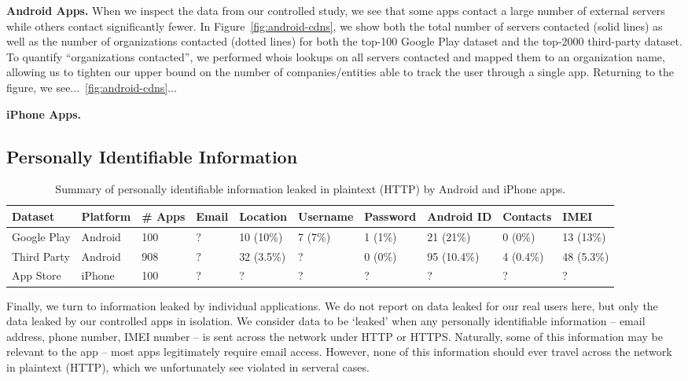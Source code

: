   {\bf Android Apps.}
  When we inspect the data from our controlled study, we see that some apps contact a large number of external servers while others contact significantly fewer.
  In Figure~\ref{fig:android-cdns}, we show both the total number of servers contacted (solid lines) as well as the number of organizations contacted (dotted lines) for both the top-100 Google Play dataset and the top-2000 third-party dataset.
  To quantify ``organizations contacted'', we performed whois lookups on all servers contacted and mapped them to an organization name, allowing us to tighten our upper bound on the number of companies/entities able to track the user through a single app.
  Returning to the figure, we see...~\ref{fig:android-cdns}...


  {\bf iPhone Apps.}

\subsection{Personally Identifiable Information}
  \begin{table}
    \begin{tabular}{l|l|l|l|l|l|l|l|l|l}
       Dataset&Platform&\# Apps&Email&Location&Username&Password&Android ID&Contacts&IMEI\\
       \hline
       Google Play&Android&100&?&10 (10\%)&7 (7\%)&1 (1\%)&21 (21\%)&0 (0\%)&13 (13\%)\\
       \hline
       Third Party&Android&908&?&32 (3.5\%)&?&0 (0\%)&95 (10.4\%)&4 (0.4\%)&48 (5.3\%)\\
       \hline
       App Store&iPhone&100&?&?&?&?&?&?&?\\
    \end{tabular}
    \caption{Summary of personally identifiable information leaked in plaintext (HTTP) by Android and iPhone apps.}
  \end{table}
  
  Finally, we turn to information leaked by individual applications. We do not report on data leaked for our real users here, but only the data leaked by our controlled apps in isolation.
  We consider data to be `leaked' when any personally identifiable information -- email address, phone number, IMEI number -- is sent across the network under HTTP or HTTPS.
  Naturally, some of this information may be relevant to the app -- most apps legitimately require email access. 
  However, none of this information should ever travel across the network in plaintext (HTTP), which we unfortunately see violated in serveral cases.

